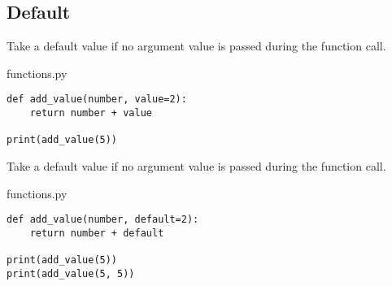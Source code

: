 \documentclass[aspectratio=1610,slidestop]{beamer}
\begin{document}
\subsection{Default}
\begin{pframe}
 Take a default value if no argument value is passed during the function call.
 \medskip

 \begin{minipage}[t]{0.47\textwidth}
  \begin{pythonfile}{functions.py}
   \begin{verbatim}
def add_value(number, value=2):
    return number + value

print(add_value(5))
   \end{verbatim}
  \end{pythonfile}
 \end{minipage}\qquad
 \begin{minipage}[t]{0.47\textwidth}
  \vspace{-2.6cm}
  \begin{terminal}
  \end{terminal}
 \end{minipage}
\end{pframe}


\begin{pframe}
 Take a default value if no argument value is passed during the function call.
 \medskip

 \begin{minipage}[t]{0.47\textwidth}
  \begin{pythonfile}{functions.py}
   \begin{verbatim}
def add_value(number, default=2):
    return number + default

print(add_value(5))
print(add_value(5, 5))
   \end{verbatim}
  \end{pythonfile}
 \end{minipage}\qquad
 \begin{minipage}[t]{0.47\textwidth}
  \vspace{-3.05cm}
  \begin{terminal}
  \end{terminal}
 \end{minipage}
\end{pframe}
\end{document}
